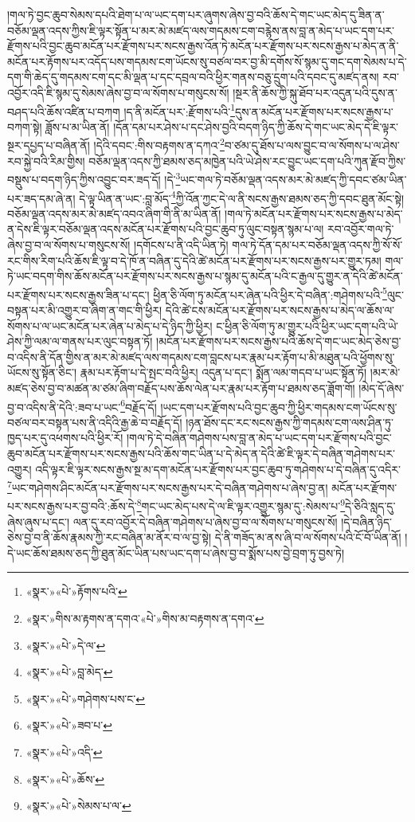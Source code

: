།གལ་ཏེ་བྱང་ཆུབ་སེམས་དཔའི་ཐེག་པ་ལ་ཡང་དག་པར་ཞུགས་ཞེས་བྱ་བའི་ཆོས་དེ་གང་ཡང་མེད་དུ་ཟིན་ན་བཅོམ་ལྡན་འདས་ཀྱིས་ཇི་ལྟར་སྟོན་པ་མར་མེ་མཛད་ལས་གདམས་ངག་བརྙེས་ནས་བླ་ན་མེད་པ་ཡང་དག་པར་རྫོགས་པའི་བྱང་ཆུབ་མངོན་པར་རྫོགས་པར་སངས་རྒྱས་འོན་ཏེ་མངོན་པར་རྫོགས་པར་སངས་རྒྱས་པ་མེད་ན་ནི་མངོན་པར་རྟོགས་པར་འདོད་པས་གདམས་ངག་ཡོངས་སུ་བཙལ་བར་བྱ་མི་དགོས་སོ་སྙམ་དུ་གང་དག་སེམས་པ་དེ་དག་གི་ཆེད་དུ་གདམས་ངག་དང་མི་ལྡན་པ་དང་དབྲལ་བའི་ཕྱིར་གནས་བཅུ་དྲུག་པའི་དབང་དུ་མཛད་ནས། རབ་འབྱོར་འདི་ཇི་སྙམ་དུ་སེམས་ཞེས་བྱ་བ་ལ་སོགས་པ་གསུངས་སོ། །སྔར་ནི་ཆོས་ཀྱི་སྐུ་ཐོབ་པར་འདུན་པའི་དུས་ན་བཤད་པའི་ཆོས་འཛིན་པ་བཀག །ད་ནི་མངོན་པར་:རྫོགས་པའི་\footnote{«སྣར་»«པེ་»རྟོགས་པའི་}དུས་ན་མངོན་པར་རྫོགས་པར་སངས་རྒྱས་པ་བཀག་སྟེ། ཟློས་པ་མ་ཡིན་ནོ། །དོན་དམ་པར་ཤེས་པ་དང་ཤེས་བྱའི་བདག་ཉིད་ཀྱི་ཆོས་དེ་གང་ཡང་མེད་དེ་ཇི་ལྟར་སྔར་དཔྱད་པ་བཞིན་ནོ། །དེའི་དབང་:གིས་བརྟགས་ན་དཀའ་\footnote{«སྣར་»གིས་མ་རྟགས་ན་དགའ་«པེ་»གིས་མ་བརྟགས་ན་དགའ་}བ་ཙམ་དུ་ཐོས་པ་ལས་བྱུང་བ་ལ་སོགས་པ་ལ་ཤེས་རབ་སྐྱེ་བའི་རིམ་གྱིས། བཅོམ་ལྡན་འདས་ཀྱི་ཐམས་ཅད་མཁྱེན་པའི་ཡེ་ཤེས་རང་བྱུང་ཡང་དག་པའི་ཀུན་རྫོབ་ཀྱིས་བསྡུས་པ་བདག་ཉིད་ཀྱིས་འབྱུང་བར་ཟད་དོ། །དེ་\footnote{«སྣར་»«པེ་»དེ་ལ་}ཡང་གལ་ཏེ་བཅོམ་ལྡན་འདས་མར་མེ་མཛད་ཀྱི་དབང་ཙམ་ཡིན་པར་ཟད་དམ་ཞེ་ན། དེ་ལྟ་ཡིན་ན་ཡང་:བླ་མོད་\footnote{«སྣར་»«པེ་»བླ་མེད་}ཀྱི་འོན་ཀྱང་དེ་ལ་ནི་སངས་རྒྱས་ཐམས་ཅད་ཀྱི་དབང་ཐུན་མོང་སྟེ། བཅོམ་ལྡན་འདས་མར་མེ་མཛད་འབའ་ཞིག་གི་ནི་མ་ཡིན་ནོ། །གལ་ཏེ་མངོན་པར་རྫོགས་པར་སངས་རྒྱས་པ་མེད་ན་དེས་ཇི་ལྟར་བཅོམ་ལྡན་འདས་མངོན་པར་རྫོགས་པའི་བྱང་ཆུབ་ཏུ་ལུང་བསྟན་སྙམ་པ་ལ། རབ་འབྱོར་གལ་ཏེ་ཞེས་བྱ་བ་ལ་སོགས་པ་གསུངས་སོ། །དགོངས་པ་ནི་འདི་ཡིན་ཏེ། གལ་ཏེ་དོན་དམ་པར་བཅོམ་ལྡན་འདས་ཀྱི་སོ་སོ་རང་གིས་རིག་པའི་ཆོས་ཇི་ལྟ་བ་དེ་ཁོ་ན་བཞིན་དུ་དེའི་ཚེ་མངོན་པར་རྫོགས་པར་སངས་རྒྱས་པར་གྱུར་ཏམ། གལ་ཏེ་ཡང་བདག་གིས་ཆོས་མངོན་པར་རྫོགས་པར་སངས་རྒྱས་པ་སྙམ་དུ་མངོན་པའི་ང་རྒྱལ་དུ་གྱུར་ན་དེའི་ཚེ་མངོན་པར་རྫོགས་པར་སངས་རྒྱས་ཟིན་པ་དང་། ཕྱིན་ཅི་ལོག་ཏུ་མངོན་པར་ཞེན་པའི་ཕྱིར་དེ་བཞིན་:གཤེགས་པའི་\footnote{«སྣར་»«པེ་»གཤེགས་པས་ང་}ལུང་བསྟན་པར་མི་འགྱུར་བ་ཞིག་ན་གང་གི་ཕྱིར། དེའི་ཚེ་ངས་མངོན་པར་རྫོགས་པར་སངས་རྒྱས་པ་མེད་ལ་ཆོས་ལ་སོགས་པ་ལ་ཡང་མངོན་པར་ཞེན་པ་མེད་པ་དེ་ཉིད་ཀྱི་ཕྱིར། ང་ཕྱིན་ཅི་ལོག་ཏུ་མ་གྱུར་པའི་ཕྱིར་ཡང་དག་པའི་ཡེ་ཤེས་ཀྱི་ལམ་ལ་གནས་པར་ལུང་བསྟན་ཏོ། །མངོན་པར་རྫོགས་པར་སངས་རྒྱས་པའི་ཆོས་དེ་གང་ཡང་མེད་ཅེས་བྱ་བ་འདིས་ནི་དོན་གྱིས་ན་མར་མེ་མཛད་ལས་གདམས་ངག་བླངས་པར་རྣམ་པར་རྟོག་པ་མི་མཐུན་པའི་ཕྱོགས་སུ་ཡོངས་སུ་སྟོན་ཅིང་། རྣམ་པར་རྟོག་པ་དེ་སྤང་བའི་ཕྱིར། འདུན་པ་དང་། སྨོན་ལམ་གདབ་པ་ཡང་སྟོན་ཏོ། །མར་མེ་མཛད་ཅེས་བྱ་བ་མཚན་མ་ཙམ་ཞིག་བརྗོད་པས་ཆོས་ལེན་པར་རྣམ་པར་རྟོག་པ་ཐམས་ཅད་ཟློག་གོ། །མེད་དོ་ཞེས་བྱ་བ་འདིས་ནི་དེའི་:ཟབ་པ་ཡང་\footnote{«སྣར་»«པེ་»ཟབ་པ་}བརྗོད་དོ། །ཡང་དག་པར་རྫོགས་པའི་བྱང་ཆུབ་ཀྱི་ཕྱིར་གདམས་ངག་ཡོངས་སུ་བཙལ་བར་བསྟན་པས་ནི་འདིའི་རྒྱ་ཆེ་བ་བརྗོད་དོ། །ཉན་ཐོས་དང་རང་སངས་རྒྱས་ཀྱི་གདམས་ངག་ལས་ཤིན་ཏུ་ཁྱད་པར་དུ་འཕགས་པའི་ཕྱིར་རོ། །གལ་ཏེ་དེ་བཞིན་གཤེགས་པས་བླ་ན་མེད་པ་ཡང་དག་པར་རྫོགས་པའི་བྱང་ཆུབ་མངོན་པར་རྫོགས་པར་སངས་རྒྱས་པའི་ཆོས་གང་ཡིན་པ་དེ་མེད་ན་དེའི་ཚེ་ཇི་ལྟར་དེ་བཞིན་གཤེགས་པར་འགྱུར། འདི་ལྟར་ཇི་ལྟར་སངས་རྒྱས་སྔ་མ་དག་མངོན་པར་རྫོགས་པར་བྱང་ཆུབ་ཏུ་གཤེགས་པ་དེ་བཞིན་དུ་འདིར་\footnote{«སྣར་»«པེ་»འདི་}ཡང་གཤེགས་ཤིང་མངོན་པར་རྫོགས་པར་སངས་རྒྱས་པར་དེ་བཞིན་གཤེགས་པ་ཞེས་བྱ་ན། མངོན་པར་རྫོགས་པར་སངས་རྒྱས་པར་བྱ་བའི་:ཆོས་དེ་\footnote{«སྣར་»«པེ་»ཆོས་}གང་ཡང་མེད་པས་དེ་ལ་ཇི་ལྟར་འགྱུར་སྙམ་དུ་:སེམས་པ་\footnote{«སྣར་»«པེ་»སེམས་པ་ལ་}དེ་ཅིའི་སླད་དུ་ཞེས་ཞུས་པ་དང་། ལན་དུ་རབ་འབྱོར་དེ་བཞིན་གཤེགས་པ་ཞེས་བྱ་བ་ལ་སོགས་པ་གསུངས་སོ། །དེ་བཞིན་ཉིད་ཅེས་བྱ་བ་ནི་ཆོས་རྣམས་ཀྱི་རང་བཞིན་མ་ནོར་བ་ལ་བྱ་སྟེ། དེ་ནི་གཟོད་མ་ནས་ཞི་བ་ལ་སོགས་པའི་ངོ་བོ་ཡིན་ནོ། །དེ་ཡང་ཆོས་ཐམས་ཅད་ཀྱི་ཐུན་མོང་ཡིན་པས་ཡང་དག་པ་ཞེས་བྱ་བ་སྨོས་པས་བྱེ་བྲག་ཏུ་བྱས་ཏེ། 